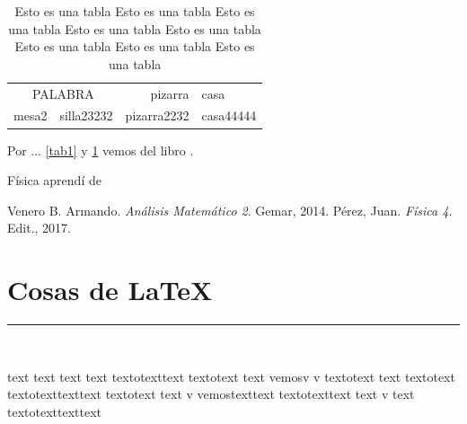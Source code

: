 \documentclass{report}
\begin{document}
\begin{table}[H]
	\begin{tabular}{|l|c|r|p{4cm}|}
		\cline{1-2}\cline{4-4}
		\multicolumn{2}{|c|}{PALABRA} & pizarra & casa\\
		\cline{1-2}
		mesa2 & silla23232 & pizarra2232 & casa44444 \\
		\cline{3-4}
	\end{tabular}
	\caption[Esto es una tabla]{Esto es una tabla Esto es una tabla Esto es una tabla Esto es una tabla Esto es una tabla Esto es una tabla Esto es una tabla Esto es una tabla}\label{tab2}
\end{table}


Por ... \ref{tab1} y \ref{tab2} vemos del libro \cite{ven14}.

Física aprendí de \cite[capítulo 4]{pe17}

\begin{thebibliography}{9}%
 Venero B. Armando. {\em Análisis Matemático 2}. Gemar, 2014.
 Pérez, Juan. \emph{Física 4}. Edit., 2017.
\end{thebibliography}

\chapter{Cosas de \LaTeX}

\rule{5cm}{3mm}


\setlength{\fboxrule}{5pt}


\setlength{\fboxsep}{7mm}


\setlength{\fboxrule}{0.4pt}
\setlength{\fboxsep}{3pt}

\\[2cm]


\parbox[c]{5cm}{text text text text textotexttext textotext text vemosv  v textotext text textotext textotexttexttext textotext text v vemostexttext textotexttext text v text textotexttexttext}



\addtocounter{page}{100}
\end{document}
